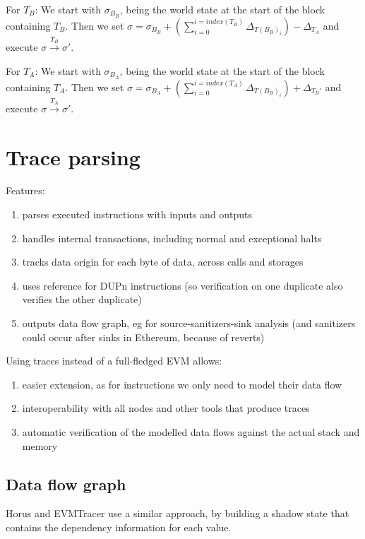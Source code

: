 \documentclass[draft,final]{vutinfth} %
\begin{document}
For $T_B$: We start with $\sigma_{B_B}$, being the world state at the start of the block containing $T_B$. Then we set $\sigma = \sigma_{B_B} + (\sum_{i=0}^{i=index(T_B)}\Delta_{T(B_B)_i}) - \Delta_{T_A}$ and execute $\sigma \xrightarrow{T_B} \sigma\prime$.

For $T_A$: We start with $\sigma_{B_A}$, being the world state at the start of the block containing $T_A$. Then we set $\sigma = \sigma_{B_A} + (\sum_{i=0}^{i=index(T_A)}\Delta_{T(B_B)_i}) + \Delta_{T_B\prime}$ and execute $\sigma \xrightarrow{T_A} \sigma\prime$.

\section{Trace parsing}

Features:

\begin{enumerate}
    \item parses executed instructions with inputs and outputs
    \item handles internal transactions, including normal and exceptional halts
    \item tracks data origin for each byte of data, across calls and storages
    \item uses reference for DUPn instructions (so verification on one duplicate also verifies the other duplicate)
    \item outputs data flow graph, eg for source-sanitizers-sink analysis (and sanitizers could occur after sinks in Ethereum, because of reverts)
\end{enumerate}

Using traces instead of a full-fledged EVM allows:

\begin{enumerate}
    \item easier extension, as for instructions we only need to model their data flow
    \item interoperability with all nodes and other tools that produce traces
    \item automatic verification of the modelled data flows against the actual stack and memory
\end{enumerate}

\subsection{Data flow graph}

Horus and EVMTracer use a similar approach, by building a shadow state that contains the dependency information for each value.
\end{document}
